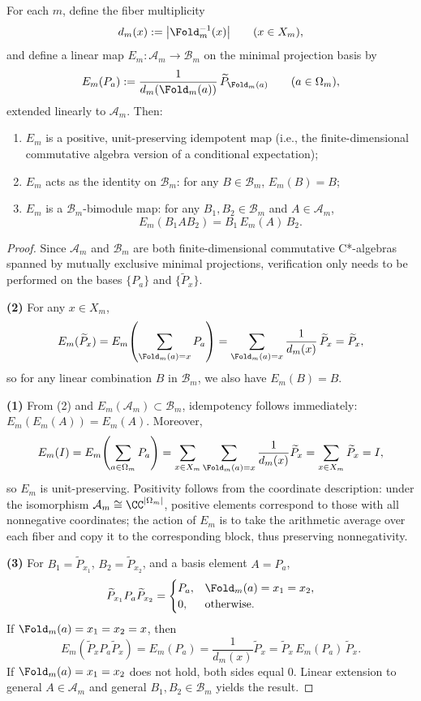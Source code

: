 \begin{proposition}\label{prop:fold-conditional-expectation}
For each $m$, define the fiber multiplicity
\[
d_m(x):=\bigl|\Fold_m^{-1}(x)\bigr|\qquad(x\in X_m),
\]
and define a linear map $E_m:\mathcal{A}_m\to \mathcal{B}_m$ on the minimal projection basis by
\[
E_m(P_a):=\frac{1}{d_m(\Fold_m(a))}\,\widetilde P_{\Fold_m(a)}\qquad(a\in\Omega_m),
\]
extended linearly to $\mathcal{A}_m$. Then:
\begin{enumerate}
  \item $E_m$ is a positive, unit-preserving idempotent map (i.e., the finite-dimensional commutative algebra version of a conditional expectation);
  \item $E_m$ acts as the identity on $\mathcal{B}_m$: for any $B\in\mathcal{B}_m$, $E_m(B)=B$;
  \item $E_m$ is a $\mathcal{B}_m$-bimodule map: for any $B_1,B_2\in\mathcal{B}_m$ and $A\in\mathcal{A}_m$,
  \[
  E_m(B_1AB_2)=B_1\,E_m(A)\,B_2.
  \]
\end{enumerate}
\end{proposition}

\begin{proof}
Since $\mathcal{A}_m$ and $\mathcal{B}_m$ are both finite-dimensional commutative C*-algebras spanned by mutually exclusive minimal projections, verification only needs to be performed on the bases $\{P_a\}$ and $\{\widetilde P_x\}$.

\textbf{(2)} For any $x\in X_m$,
\[
E_m(\widetilde P_x)=E_m\!\left(\sum_{\Fold_m(a)=x}P_a\right)
=\sum_{\Fold_m(a)=x}\frac{1}{d_m(x)}\,\widetilde P_x
=\widetilde P_x,
\]
so for any linear combination $B$ in $\mathcal{B}_m$, we also have $E_m(B)=B$.

\textbf{(1)} From (2) and $E_m(\mathcal{A}_m)\subset\mathcal{B}_m$, idempotency follows immediately: $E_m(E_m(A))=E_m(A)$. Moreover,
\[
E_m(I)=E_m\!\left(\sum_{a\in\Omega_m}P_a\right)
=\sum_{x\in X_m}\sum_{\Fold_m(a)=x}\frac{1}{d_m(x)}\widetilde P_x
=\sum_{x\in X_m}\widetilde P_x
=I,
\]
so $E_m$ is unit-preserving. Positivity follows from the coordinate description: under the isomorphism $\mathcal{A}_m\cong\CC^{|\Omega_m|}$, positive elements correspond to those with all nonnegative coordinates; the action of $E_m$ is to take the arithmetic average over each fiber and copy it to the corresponding block, thus preserving nonnegativity.

\textbf{(3)} For $B_1=\widetilde P_{x_1}$, $B_2=\widetilde P_{x_2}$, and a basis element $A=P_a$,
\[
\widetilde P_{x_1}P_a\widetilde P_{x_2}
=
\begin{cases}
P_a,& \Fold_m(a)=x_1=x_2,\\
0,& \text{otherwise}.
\end{cases}
\]
If $\Fold_m(a)=x_1=x_2=x$, then
\[
E_m(\widetilde P_xP_a\widetilde P_x)=E_m(P_a)=\frac{1}{d_m(x)}\widetilde P_x
=\widetilde P_x\,E_m(P_a)\,\widetilde P_x.
\]
If $\Fold_m(a)=x_1=x_2$ does not hold, both sides equal $0$. Linear extension to general $A\in\mathcal{A}_m$ and general $B_1,B_2\in\mathcal{B}_m$ yields the result.
\end{proof}

